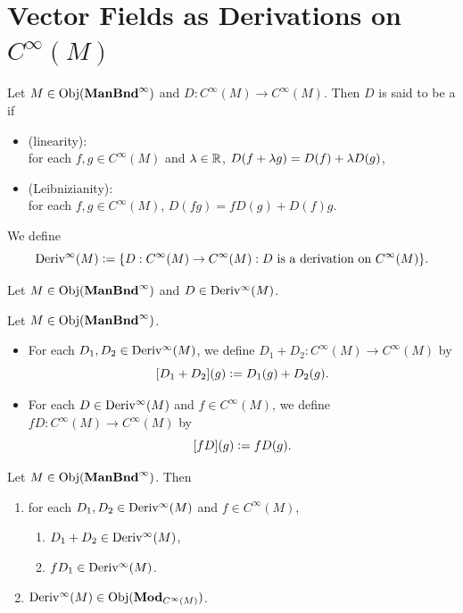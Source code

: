 \documentclass{book}
\begin{document}
\newpage
\section{Vector Fields as Derivations on $C^{\infty}(M)$}

\begin{defn}
	Let $M \in \operatorname{Obj}(\operatorname*{\text{\textbf{ManBnd}}^{\infty}})$ and $D: C^{\infty}(M) \rightarrow C^{\infty}(M)$. Then $D$ is said to be a  if 
	\begin{itemize}
		\item (linearity): \\
		for each $f,g \in C^{\infty}(M)$ and $\lambda \in \mathbb{R}$, $D(f + \lambda g) = D(f) + \lambda D(g)$,
		\item (Leibnizianity): \\
		for each $f,g \in C^{\infty}(M)$, $D(fg) = fD(g) + D(f)g$.
	\end{itemize}
	We define 
	$$\operatorname{Deriv^{\infty}}(M) \vcentcolon= \{D: C^{\infty}(M) \rightarrow C^{\infty}(M): D \text{ is a derivation on $C^{\infty}(M)$}\}.$$
\end{defn}

\begin{ex}
	Let $M \in \operatorname{Obj}(\operatorname*{\text{\textbf{ManBnd}}^{\infty}})$ and $D \in \operatorname{Deriv^{\infty}}(M)$.
\end{ex}

\begin{defn}
	Let $M \in \operatorname{Obj}(\operatorname*{\text{\textbf{ManBnd}}^{\infty}})$. 
	\begin{itemize}
		\item For each $D_1, D_2 \in \operatorname{Deriv^{\infty}}(M)$, we define $D_1 + D_2 : C^{\infty}(M) \rightarrow C^{\infty}(M)$ by 
		$$[D_1 + D_2] (g) \vcentcolon= D_1(g) + D_2(g).$$
		\item For each $D \in \operatorname{Deriv^{\infty}}(M)$ and $f \in C^{\infty}(M)$, we define $f D : C^{\infty}(M) \rightarrow C^{\infty}(M)$ by 
		$$[f D] (g) \vcentcolon= f D(g).$$
	\end{itemize}
\end{defn}

\begin{ex} 
	Let $M \in \operatorname{Obj}(\operatorname*{\text{\textbf{ManBnd}}^{\infty}})$. Then
	\begin{enumerate}
		\item for each $D_1, D_2 \in \operatorname{Deriv^{\infty}}(M)$ and $f \in C^{\infty}(M)$, 
		\begin{enumerate}
			\item $D_1 + D_2 \in \operatorname{Deriv^{\infty}}(M)$,
			\item $f D_1 \in \operatorname{Deriv^{\infty}}(M)$. 
		\end{enumerate}
		\item $\operatorname{Deriv^{\infty}}(M) \in \operatorname{Obj}(\operatorname*{\text{\textbf{Mod}}}_{C^{\infty}(M)})$.
	\end{enumerate}
\end{ex}
\end{document}
